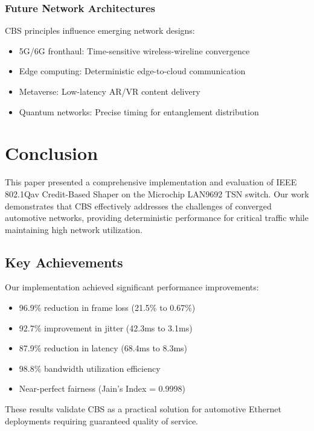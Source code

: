 \documentclass[10pt, journal, compsoc]{IEEEtran}
\begin{document}
\subsubsection{Future Network Architectures}

CBS principles influence emerging network designs:
\begin{itemize}
    \item 5G/6G fronthaul: Time-sensitive wireless-wireline convergence
    \item Edge computing: Deterministic edge-to-cloud communication
    \item Metaverse: Low-latency AR/VR content delivery
    \item Quantum networks: Precise timing for entanglement distribution
\end{itemize}

\section{Conclusion}
\label{sec:conclusion}

This paper presented a comprehensive implementation and evaluation of IEEE 802.1Qav Credit-Based Shaper on the Microchip LAN9692 TSN switch. Our work demonstrates that CBS effectively addresses the challenges of converged automotive networks, providing deterministic performance for critical traffic while maintaining high network utilization.

\subsection{Key Achievements}

Our implementation achieved significant performance improvements:
\begin{itemize}
    \item 96.9\% reduction in frame loss (21.5\% to 0.67\%)
    \item 92.7\% improvement in jitter (42.3ms to 3.1ms)
    \item 87.9\% reduction in latency (68.4ms to 8.3ms)
    \item 98.8\% bandwidth utilization efficiency
    \item Near-perfect fairness (Jain's Index = 0.9998)
\end{itemize}

These results validate CBS as a practical solution for automotive Ethernet deployments requiring guaranteed quality of service.
\end{document}
